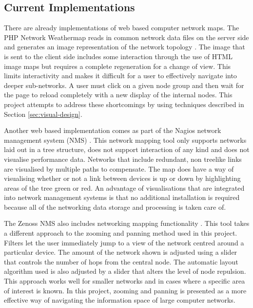 \documentclass[11pt, a4paper]{article}
\begin{document}
\subsection{Current Implementations}
\label{sec:current-implementations}

There are already implementations of web based computer network maps. The PHP
Network Weathermap reads in common network data files on the server side and
generates an image representation of the network topology
\cite{PHP_Network_Weathermap_website}. The image that is sent to the client side
includes some interaction through the use of HTML image maps but requires a
complete regeneration for a change of view. This limits interactivity and makes
it difficult for a user to effectively navigate into deeper sub-networks. A user
must click on a given node group and then wait for the page to reload completely
with a new display of the internal nodes. This project attempts to address
these shortcomings by using techniques described in Section
\ref{sec:visual-design}. 

Another web based implementation comes as part of the Nagios network management
system (NMS) \cite{Nagios_website}. This network mapping tool only supports
networks laid out in a tree structure, does not support interaction of any kind
and does not visualise performance data. Networks that include redundant, non
treelike links are visualised by multiple paths to compensate. The map does
have a way of visualising whether or not a link between devices is up or down by
highlighting areas of the tree green or red. An advantage of visualisations that
are integrated into network management systems is that no additional
installation is required because all of the networking data storage and
processing is taken care of.

The Zenoss NMS also includes networking mapping functionality
\cite{Zenoss_website}. This tool takes a different approach to the zooming and
panning method used in this project. Filters let the user immediately jump to a
view of the network centred around a particular device. The amount of the
network shown is adjusted using a slider that controls the number of hops from
the central node. The automatic layout algorithm used is also adjusted by a
slider that alters the level of node repulsion. This approach works well for
smaller networks and in cases where a specific area of interest is known. In
this project, zooming and panning is presented as a more effective way of
navigating the information space of large computer networks.
\end{document}
